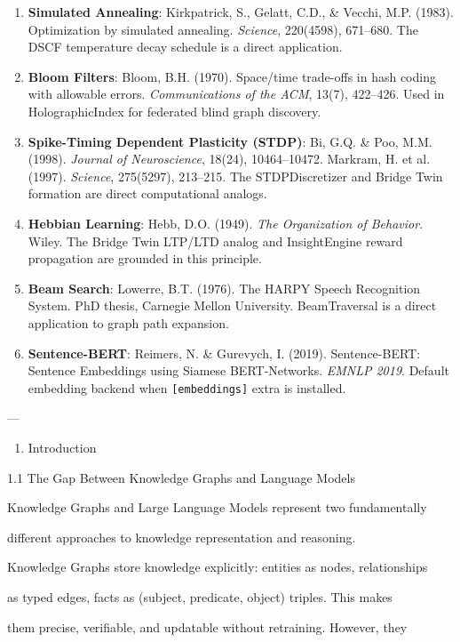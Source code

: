 \documentclass[10pt,journal,compsoc]{IEEEtran}
\begin{document}
\begin{enumerate}
\item \textbf{Simulated Annealing}: Kirkpatrick, S., Gelatt, C.D., \& Vecchi, M.P. (1983). Optimi\-zation by simulated annealing. \textit{Science}, 220(4598), 671–680. The DSCF temperature decay schedule is a direct application.
\item \textbf{Bloom Filters}: Bloom, B.H. (1970). Space/time trade-offs in hash coding with allowable errors. \textit{Commun\-ications of the ACM}, 13(7), 422–426. Used in Hologr\-aphicIndex for federated blind graph discovery.
\item \textbf{Spike-Timing Dependent Plasticity (STDP)}: Bi, G.Q. \& Poo, M.M. (1998). \textit{Journal of Neuros\-cience}, 18(24), 10464–10472. Markram, H. et al. (1997). \textit{Science}, 275(5297), 213–215. The STDPDiscre\-tizer and Bridge Twin formation are direct compu\-tational analogs.
\item \textbf{Hebbian Learning}: Hebb, D.O. (1949). \textit{The Organi\-zation of Behavior}. Wiley. The Bridge Twin LTP/LTD analog and InsightEngine reward propagation are grounded in this principle.
\item \textbf{Beam Search}: Lowerre, B.T. (1976). The HARPY Speech Recognition System. PhD thesis, Carnegie Mellon University. BeamTraversal is a direct application to graph path expansion.
\item \textbf{Sentence-BERT}: Reimers, N. \& Gurevych, I. (2019). Sentence-BERT: Sentence Embeddings using Siamese BERT-Networks. \textit{EMNLP 2019}. Default embedding backend when \texttt{[embeddings]} extra is installed.


\end{enumerate}
---

\begin{enumerate}
\item Introd\-uction

\end{enumerate}
1.1 The Gap Between Knowledge Graphs and Language Models

Knowledge Graphs and Large Language Models represent two funda\-mentally

different approaches to knowledge repre\-sentation and reasoning.

Knowledge Graphs store knowledge explicitly: entities as nodes, relat\-ionships

as typed edges, facts as (subject, predicate, object) triples. This makes

them precise, verifiable, and updatable without retraining. However, they
\end{document}
